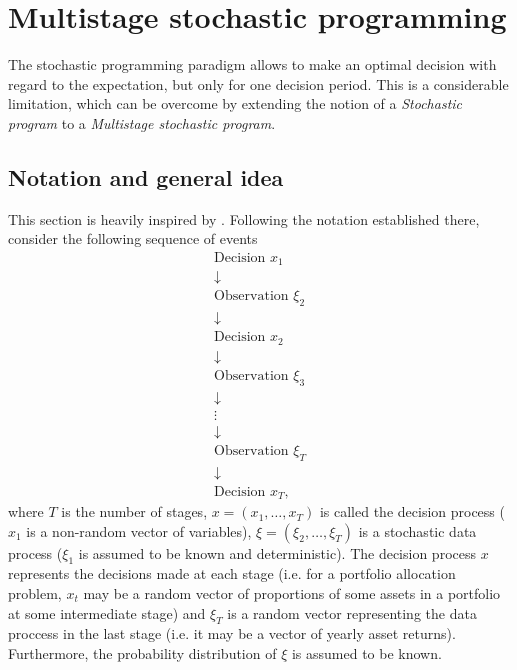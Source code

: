 \section{Multistage stochastic programming}
The stochastic programming paradigm allows to make an optimal decision with regard to the expectation, but only for one decision period. This is a considerable limitation, which can be overcome by extending the notion of a \textit{Stochastic program} to a \textit{Multistage stochastic program}. 

\subsection{Notation and general idea}
This section is heavily inspired by \cite[Section 3.3.]{stochasticprogrammingbible}.
Following the notation established there, consider the following sequence of events
\begin{equation*}
\begin{gathered}
\mathrm{Decision} \, \, x_1 
\\
\downarrow
\\
\mathrm{Observation} \,\, \xi_2
\\
\downarrow
\\
\mathrm{Decision} \,\, x_2 
\\
\downarrow
\\
\mathrm{Observation} \,\, \xi_3
\\
\downarrow
\\
\vdots
\\
\downarrow
\\
\mathrm{Observation} \,\, \xi_T
\\
\downarrow
\\
\mathrm{Decision} \,\, x_T,
\end{gathered}
\end{equation*}
where $T$ is the number of stages, $x=(x_1,\dots,x_T)$ is called the decision process ($x_1$ is a non-random vector of variables), $\xi = (\xi_2,\dots,\xi_T)$ is a stochastic data process ($\xi_1$ is assumed to be known and deterministic). The decision process $x$ represents the decisions made at each stage (i.e. for a portfolio allocation problem, $x_t$ may be a random vector of proportions of some assets in a portfolio at some intermediate stage) and $\xi_T$ is a random vector representing the data proccess in the last stage (i.e. it may be a vector of yearly asset returns). Furthermore, the probability distribution of $\xi$ is assumed to be known.
